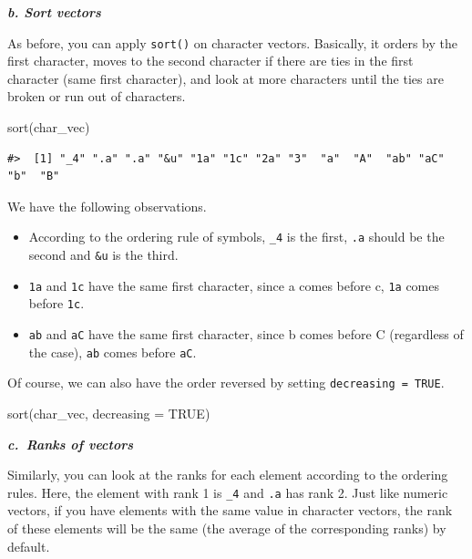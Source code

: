 \documentclass[
]{book}
\newenvironment{Shaded}{\begin{snugshade}}{\end{snugshade}}
\newcommand{\AttributeTok}[1]{\textcolor[rgb]{0.77,0.63,0.00}{#1}}
\newcommand{\ConstantTok}[1]{\textcolor[rgb]{0.00,0.00,0.00}{#1}}
\newcommand{\FunctionTok}[1]{\textcolor[rgb]{0.00,0.00,0.00}{#1}}
\newcommand{\NormalTok}[1]{#1}
\providecommand{\tightlist}{%
  \setlength{\itemsep}{0pt}\setlength{\parskip}{0pt}}
\begin{document}
\textbf{\emph{b. Sort vectors}}

As before, you can apply \texttt{sort()} on character vectors. Basically, it orders by the first character, moves to the second character if there are ties in the first character (same first character), and look at more characters until the ties are broken or run out of characters.

\begin{Shaded}
\begin{Highlighting}[]
\FunctionTok{sort}\NormalTok{(char\_vec)}
\end{Highlighting}
\end{Shaded}

\begin{verbatim}
#>  [1] "_4" ".a" ".a" "&u" "1a" "1c" "2a" "3"  "a"  "A"  "ab" "aC" "b"  "B"
\end{verbatim}

We have the following observations.

\begin{itemize}
\tightlist
\item
  According to the ordering rule of symbols, \texttt{\_4} is the first, \texttt{.a} should be the second and \texttt{\&u} is the third.
\item
  \texttt{1a} and \texttt{1c} have the same first character, since a comes before c, \texttt{1a} comes before \texttt{1c}.
\item
  \texttt{ab} and \texttt{aC} have the same first character, since b comes before C (regardless of the case), \texttt{ab} comes before \texttt{aC}.
\end{itemize}

Of course, we can also have the order reversed by setting \texttt{decreasing\ =\ TRUE}.

\begin{Shaded}
\begin{Highlighting}[]
\FunctionTok{sort}\NormalTok{(char\_vec, }\AttributeTok{decreasing =} \ConstantTok{TRUE}\NormalTok{)}
\end{Highlighting}
\end{Shaded}

\textbf{\emph{c.~Ranks of vectors}}

Similarly, you can look at the ranks for each element according to the ordering rules. Here, the element with rank 1 is \texttt{\_4} and \texttt{.a} has rank 2. Just like numeric vectors, if you have elements with the same value in character vectors, the rank of these elements will be the same (the average of the corresponding ranks) by default.
\end{document}
